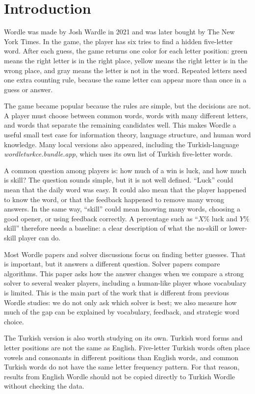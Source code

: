 \documentclass[conference]{IEEEtran}
\begin{document}
\section{Introduction}

Wordle was made by Josh Wardle in 2021 and was later bought by The New
York Times. In the game, the player has six tries to find a hidden
five-letter word. After each guess, the game returns one color for each
letter position: green means the right letter is in the right place,
yellow means the right letter is in the wrong place, and gray means the
letter is not in the word. Repeated letters need one extra counting rule,
because the same letter can appear more than once in a guess or answer.

The game became popular because the rules are simple, but the decisions
are not. A player must choose between common words, words with many
different letters, and words that separate the remaining candidates well.
This makes Wordle a useful small test case for information theory,
language structure, and human word knowledge. Many local versions also
appeared, including the Turkish-language
\textit{wordleturkce.bundle.app}, which uses its own list of Turkish
five-letter words.

A common question among players is: how much of a win is luck, and how
much is skill? The question sounds simple, but it is not well defined.
``Luck'' could mean that the daily word was easy. It could also mean
that the player happened to know the word, or that the feedback happened
to remove many wrong answers. In the same way, ``skill'' could mean
knowing many words, choosing a good opener, or using feedback correctly.
A percentage such as ``$X\%$ luck and $Y\%$ skill'' therefore needs a
baseline: a clear description of what the no-skill or lower-skill player
can do.

Most Wordle papers and solver discussions focus on finding better
guesses. That is important, but it answers a different question. Solver
papers compare algorithms. This paper asks how the answer changes when
we compare a strong solver to several weaker players, including a
human-like player whose vocabulary is limited. This is the main part of
the work that is different from previous Wordle studies: we do not only
ask which solver is best; we also measure how much of the gap can be
explained by vocabulary, feedback, and strategic word choice.

The Turkish version is also worth studying on its own. Turkish word
forms and letter positions are not the same as English. Five-letter
Turkish words often place vowels and consonants in different positions
than English words, and common Turkish words do not have the same letter
frequency pattern. For that reason, results from English Wordle should
not be copied directly to Turkish Wordle without checking the data.
\end{document}
